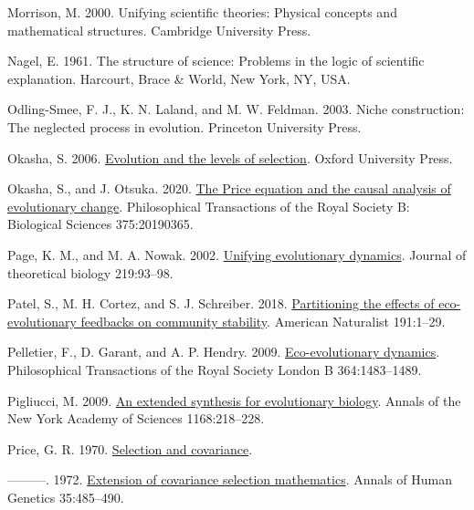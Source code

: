 \documentclass[
]{article}
\newlength{\cslhangindent}
\newenvironment{CSLReferences}[2] %
 {\begin{list}{}{%
  \setlength{\itemindent}{0pt}
  \setlength{\leftmargin}{0pt}
  \setlength{\parsep}{0pt}
  \ifodd #1
   \setlength{\leftmargin}{\cslhangindent}
   \setlength{\itemindent}{-1\cslhangindent}
  \fi
  \setlength{\itemsep}{#2\baselineskip}}}
 {\end{list}}
\begin{document}
\begin{CSLReferences}{0}{0}
Morrison, M. 2000. Unifying scientific theories: Physical concepts and
mathematical structures. Cambridge University Press.

Nagel, E. 1961. The structure of science: Problems in the logic of
scientific explanation. Harcourt, Brace \& World, New York, NY, USA.

Odling-Smee, F. J., K. N. Laland, and M. W. Feldman. 2003. Niche
construction: The neglected process in evolution. Princeton University
Press.

Okasha, S. 2006.
\href{https://doi.org/10.1093/acprof:oso/9780199267972.001.0001}{Evolution
and the levels of selection}. Oxford University Press.

Okasha, S., and J. Otsuka. 2020.
\href{https://doi.org/10.1098/rstb.2019.0365}{{The Price equation and
the causal analysis of evolutionary change}}. Philosophical Transactions
of the Royal Society B: Biological Sciences 375:20190365.

Page, K. M., and M. A. Nowak. 2002.
\href{https://doi.org/10.1006/jtbi.2002.3112}{Unifying evolutionary
dynamics}. Journal of theoretical biology 219:93--98.

Patel, S., M. H. Cortez, and S. J. Schreiber. 2018.
\href{https://doi.org/10.1101/104505}{{Partitioning the effects of
eco-evolutionary feedbacks on community stability}}. American Naturalist
191:1--29.

Pelletier, F., D. Garant, and A. P. Hendry. 2009.
\href{https://doi.org/10.1098/rstb.2009.0027}{Eco-evolutionary
dynamics}. Philosophical Transactions of the Royal Society London B
364:1483--1489.

Pigliucci, M. 2009.
\href{https://doi.org/10.1111/j.1749-6632.2009.04578.x}{{An extended
synthesis for evolutionary biology}}. Annals of the New York Academy of
Sciences 1168:218--228.

Price, G. R. 1970. \href{https://doi.org/10.1038/227520a0}{{Selection
and covariance}}.

---------. 1972.
\href{https://doi.org/10.1111/j.1469-1809.1957.tb01874.x}{{Extension of
covariance selection mathematics}}. Annals of Human Genetics
35:485--490.


\end{CSLReferences}
\end{document}
